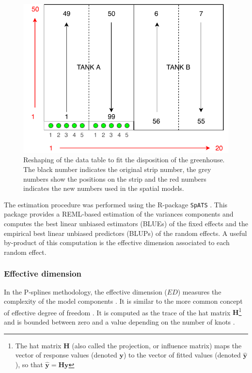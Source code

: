 \begin{figure}[hbtp]
	\centering
	\includegraphics[scale = 0.7]{figures/TANK_repartition.pdf}
	\caption[Reshaping of the data table to fit the disposition of the greenhouse]{Reshaping of the data table to fit the 
	disposition of the greenhouse. The black number indicates the original strip number, the grey numbers show the positions on 
	the strip and the red numbers indicates the new 
	numbers used in the spatial models.}
	\label{fig:tank_disposition}	
\end{figure}

The estimation procedure was performed using the R-package \texttt{SpATS} \parencite{rodriguez-alvarez_spats:_2016}. This package provides a REML-based estimation of the variances components and computes the best linear unbiased estimators (BLUEs) of the fixed effects and the empirical best linear unbiased predictors (BLUPs) of the random effects. A useful by-product of this computation is the effective dimension associated to each random effect.

\subsubsection{Effective dimension}
In the P-splines methodology, the effective dimension ($ED$) measures the complexity of the model components \parencite{eilers_twenty_2015}. It is similar to the more common concept of effective degree of freedom \parencite{buja1989linear}. It is computed as the trace of the hat matrix $\mathbf{H}$\footnote{The hat matrix $\mathbf{H}$ (also called the projection, or influence matrix) maps the vector of response values (denoted $\mathbf{y}$) to the vector of fitted values (denoted $ \hat{\mathbf{y}}$), so that $\hat{\mathbf{y}}=\mathbf{H} \mathbf{y}$} and is bounded between zero and a value depending on the number of knots \parencite{rodriguez-alvarez_spatial_2016}.\\

